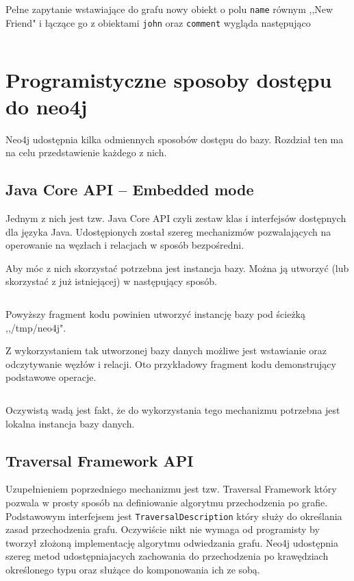 \documentclass[brudnopis]{xmgr}
\begin{document}
\inputminted{cypher}{listings/cypher/return-section-2.cypher}

Pełne zapytanie wstawiające do grafu nowy obiekt o polu \texttt{name} równym ,,New Friend" i łączące go z obiektami \texttt{john} oraz \texttt{comment} wygląda następująco

\inputminted{cypher}{listings/cypher/sample-create-query.cypher}

\section{Programistyczne sposoby dostępu do neo4j}

Neo4j udostępnia kilka odmiennych sposobów dostępu do bazy. Rozdział ten ma na celu przedstawienie każdego z nich.

\subsection{Java Core API -- Embedded mode}

Jednym z nich jest tzw. Java Core API czyli zestaw klas i interfejsów dostępnych dla języka Java. Udostępionych został szereg mechanizmów pozwalających na operowanie na węzłach i relacjach w sposób bezpośredni.

Aby móc z nich skorzystać potrzebna jest instancja bazy. Można ją utworzyć (lub skorzystać z już istniejącej) w następujący sposób.

\inputminted{java}{listings/java/neo4j-core-api-dbcreate.java}

Powyższy fragment kodu powinien utworzyć instancję bazy pod ścieżką ,,/tmp/neo4j".

Z wykorzystaniem tak utworzonej bazy danych możliwe jest wstawianie oraz odczytywanie węzłów i relacji. Oto przykładowy fragment kodu demonstrujący podstawowe operacje.

\inputminted{java}{listings/java/neo4j-core-api-use.java}

Oczywistą wadą jest fakt, że do wykorzystania tego mechanizmu potrzebna jest lokalna instancja bazy danych.

\subsection{Traversal Framework API}

Uzupełnieniem poprzedniego mechanizmu jest tzw. Traversal Framework który pozwala w prosty sposób na definiowanie algorytmu przechodzenia po grafie. Podstawowym interfejsem jest \texttt{TraversalDescription} który służy do określania zasad przechodzenia grafu. Oczywiście nikt nie wymaga od programisty by tworzył złożoną implementację algorytmu odwiedzania grafu. Neo4j udostępnia szereg metod udostępniajacych zachowania do przechodzenia po krawędziach określonego typu oraz służące do komponowania ich ze sobą.
\end{document}

